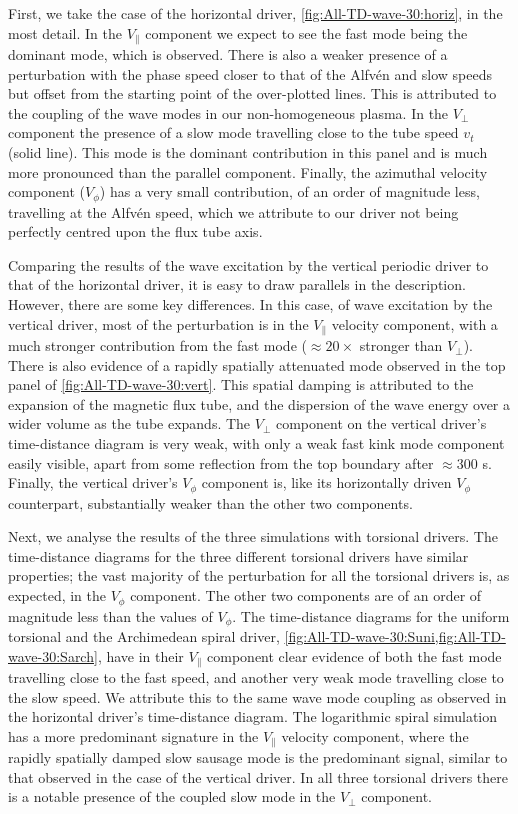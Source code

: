 First, we take the case of the horizontal driver, \cref{fig:All-TD-wave-30:horiz}, in the most detail. 
In the $V_\parallel$ component we expect to see the fast mode being the dominant mode, which is observed.
There is also a weaker presence of a perturbation with the phase speed closer to that of the Alfv\'en and slow speeds but offset from the starting point of the over-plotted lines.
This is attributed to the coupling of the wave modes in our non-homogeneous plasma.
In the $V_\perp$ component the presence of a slow mode travelling close to the tube speed $v_t$ (solid line).
This mode is the dominant contribution in this panel and is much more pronounced than the parallel component. 
Finally, the azimuthal velocity component ($V_\phi$) has a very small contribution, of an order of magnitude less, travelling at the Alfv\'en speed, which we attribute to our driver not being perfectly centred upon the flux tube axis.

Comparing the results of the wave excitation by the vertical periodic driver to that of the horizontal driver, it is easy to draw parallels in the description.
However, there are some key differences. 
In this case, of wave excitation by the vertical driver, most of the perturbation is in the $V_\parallel$ velocity component, with a much stronger contribution from the fast mode ($\approx 20 \times$ stronger than $V_\perp$).
There is also evidence of a rapidly spatially attenuated mode observed in the top panel of \cref{fig:All-TD-wave-30:vert}.
This spatial damping is attributed to the expansion of the magnetic flux tube, and the dispersion of the wave energy over a wider volume as the tube expands.
The $V_\perp$ component on the vertical driver's time-distance diagram is very weak, with only a weak fast kink mode component easily visible, apart from some reflection from the top boundary after $\approx300$ s. 
Finally, the vertical driver's $V_\phi$ component is, like its horizontally driven $V_\phi$ counterpart, substantially weaker than the other two components.

Next, we analyse the results of the three simulations with torsional drivers.
The time-distance diagrams for the three different torsional drivers have similar properties; the vast majority of the perturbation for all the torsional drivers is, as expected, in the $V_\phi$ component.
The other two components are of an order of magnitude less than the values of $V_\phi$.
The time-distance diagrams for the uniform torsional and the Archimedean spiral driver, \cref{fig:All-TD-wave-30:Suni,fig:All-TD-wave-30:Sarch}, have in their $V_\parallel$ component clear evidence of both the fast mode travelling close to the fast speed, and another very weak mode travelling close to the slow speed.
We attribute this to the same wave mode coupling as observed in the horizontal driver's time-distance diagram. 
The logarithmic spiral simulation has a more predominant signature in the $V_\parallel$ velocity component, where the rapidly spatially damped slow sausage mode is the predominant signal, similar to that observed in the case of the vertical driver. 
In all three torsional drivers there is a notable presence of the coupled slow mode in the $V_\perp$ component. 

